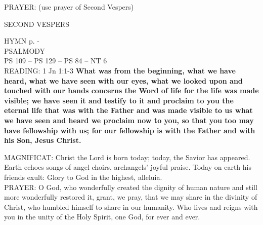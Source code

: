 \noindent\small{\uppercase{PRAYER:}} (use prayer of Second Vespers)

\begin{flushleft}\normalsize{\uppercase{SECOND VESPERS\\}}\label{christmas:nativity2ndVespers}\end{flushleft}
\small{\uppercase{HYMN} p. \pageref{christmas:firstHymn}-\pageref{christmas:lastHymn}\\}
\noindent\small{\uppercase{Psalmody}\\}
\uppercase{Ps 109 -- Ps 129 -- Ps 84 -- NT 6}\vspace{0.5em}\\

\noindent\small{\uppercase{READING:}}    1 Jn 1:1-3 \textbf{    What was from the beginning, what we have heard, what we have seen with our eyes, what we looked upon and touched with our hands concerns the Word of life for the life was made visible; we have seen it and testify to it and proclaim to you the eternal life that was with the Father and was made visible to us what we have seen and heard we proclaim now to you, so that you too may have fellowship with us; for our fellowship is with the Father and with his Son, Jesus Christ.\\}

\noindent\small{\uppercase{MAGNIFICAT:}}	Christ the Lord is born today; today, the Savior has appeared. Earth echoes songs of angel choirs, archangels' joyful praise. Today on earth his friends exult: Glory to God in the highest, alleluia.\\

\noindent\small{\uppercase{PRAYER:}}	O God, who wonderfully created the dignity of human nature and still more wonderfully restored it, grant, we pray, that we may share in the divinity of Christ, who humbled himself to share in our humanity. Who lives and reigns with you in the unity of the Holy Spirit, one God, for ever and ever.\\
